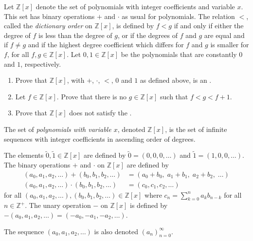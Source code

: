 \Newpage
\begin{exercise} %
	Let $\mathbb{Z}[x]$ denote the set of polynomials with integer coefficients and variable $x$. This set has binary operations $+$ and $\cdot$ as usual for polynomials. The relation $<$, called the \emph{dictionary order} on $\mathbb{Z}[x]$, is defined by $f < g$ if and only if either the degree of $f$ is less than the degree of $g$, or if the degrees of $f$ and $g$ are equal and if $f \neq g$ and if the highest degree coefficient which differs for $f$ and $g$ is smaller for $f$, for all $f, g \in \mathbb{Z}[x]$. Let $0, 1 \in \mathbb{Z}[x]$ be the polynomials that are constantly $0$ and $1$, respectively.
	\begin{enumerate}
		\item \label{int2:e:7:1}
		      Prove that $\mathbb{Z}[x]$, with $+$, $\cdot$, $<$, $0$ and $1$ as defined above, is an .
		\item \label{int2:e:7:2}
		      Let $f \in \mathbb{Z}[x]$. Prove that there is no $g \in \mathbb{Z}[x]$ such that $f < g < f + 1$.
		\item \label{int2:e:7:3}
		      Prove that $\mathbb{Z}[x]$ does not satisfy the .
	\end{enumerate}
\end{exercise}

\begin{definition}
	The set of \emph{polynomials with variable $x$}, denoted $\mathbb{Z}[x]$, is the set of infinite sequences with integer coefficients in ascending order of degrees.

	The elements $\widetilde{0}, \widetilde{1} \in \mathbb{Z}[x]$ are defined by $\widetilde{0} = (0, 0, 0, \ldots)$ and $\widetilde{1} = (1, 0,0, \ldots)$. The binary operations $+$ and $\cdot$ on $\mathbb{Z}[x]$ are defined by
	\begin{align*}
		(a_0, a_1, a_2, \ldots) + (b_0, b_1, b_2, \ldots)     & = (a_0 + b_0,\; a_1 + b_1,\; a_2 + b_2,\; \ldots) \\
		(a_0, a_1, a_2, \ldots) \cdot (b_0, b_1, b_2, \ldots) & = (c_0, c_1, c_2, \ldots)
	\end{align*}
	for all $(a_0, a_1, a_2, \ldots), (b_0, b_1, b_2, \ldots) \in \mathbb{Z}[x]$ where $c_n = \sum_{k = 0}^n a_k b_{n - k}$ for all $n \in \mathbb{Z}^{+}$. The unary operation $-$ on $\mathbb{Z}[x]$ is defined by $-(a_0, a_1, a_2, \ldots) = (-a_0, -a_1, -a_2, \ldots)$.

	The sequence $(a_0, a_1, a_2, \ldots)$ is also denoted $(a_n)_{n=0}^\infty$.
\end{definition}


